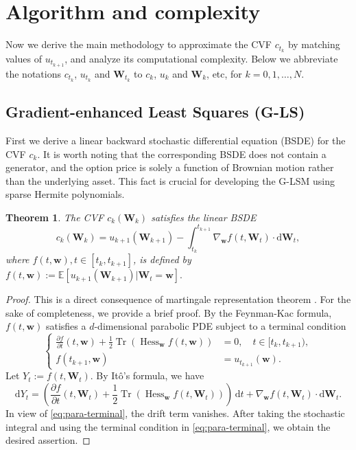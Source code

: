 \documentclass[10pt,a4paper]{amsart}
\numberwithin{equation}{section}
\numberwithin{algorithm}{section}
\theoremstyle{plain}
\newtheorem{theorem}{Theorem}[section]
\theoremstyle{remark}
\newcommand{\dd}{\mathrm{d}}
\begin{document}
\section{Algorithm and complexity} \label{sec:algorithm-cost}
Now we derive the main methodology to approximate the CVF $c_{t_k}$ by matching values of $u_{t_{k+1}}$, and analyze its computational complexity.
Below we abbreviate the notations $c_{t_k}$, $u_{t_k}$ and $\mathbf{W}_{t_k}$ to $c_k$, $u_k$ and $\mathbf{W}_k$, etc, for $k=0,1,\dots, N$.

\subsection{Gradient-enhanced Least Squares (G-LS)}
First we derive a linear backward stochastic differential equation (BSDE) for the CVF $ c_k$. It is worth noting that the corresponding BSDE does not contain a generator, and the option price is solely a function of Brownian motion rather than the underlying asset. This fact is crucial for developing the G-LSM using sparse Hermite polynomials.
\begin{theorem} \label{thm: linear bsde}
The CVF $c_k(\mathbf{W}_k)$ satisfies the linear BSDE
    \begin{equation*}
        c_k(\mathbf{W}_k) = u_{k+1}(\mathbf{W}_{k+1}) - \int_{t_k}^{t_{k+1}} \nabla_{\mathbf{w}}f(t, \mathbf{W}_t) \cdot \mathrm{d}\mathbf{W}_t,
    \end{equation*} 
where $f(t, \mathbf{w}), t\in [t_k, t_{k+1}]$, is defined by
$f(t, \mathbf{w}) := \mathbb{E}[ u_{k+1}(\mathbf{W}_{k+1}) | \mathbf{W}_t = \mathbf{w} ].$
\end{theorem}
\begin{proof}
This is a direct consequence of martingale representation theorem \cite[Theorem 2.5.2]{zhang2017backward}. For the sake of completeness, we provide a brief proof. 
By the Feynman-Kac formula, $f(t, \mathbf{w})$ satisfies a $d$-dimensional parabolic PDE subject to a terminal condition
\begin{equation}\label{eq:para-terminal}
\left\{
\begin{aligned}
\frac{\partial f}{\partial t}(t, \mathbf{w}) + \frac{1}{2}\operatorname{Tr}\left(\operatorname{Hess}_{\mathbf{w}}f(t,\mathbf{w}) \right) &= 0,\quad  t\in [t_k, t_{k+1}), \\
f(t_{k+1}, \mathbf{w}) &= u_{t_{k+1}}(\mathbf{w}).
\end{aligned}
\right.
\end{equation}
Let $Y_t := f(t, \mathbf{W}_t)$. By It\^{o}'s formula, we have
    \begin{equation*}
        \dd Y_t = \left( \frac{\partial f}{\partial t}(t, \mathbf{W}_t) + \frac{1}{2}\operatorname{Tr}\left(\operatorname{Hess}_{\mathbf{w}}f(t,\mathbf{W}_t) \right) \right) \,\mathrm{d}t + \nabla_{\mathbf{w}}f(t, \mathbf{W}_t) \cdot \mathrm{d}\mathbf{W}_t.
    \end{equation*}
In view of \cref{eq:para-terminal}, the drift term vanishes. After taking the stochastic integral and using the terminal condition in \cref{eq:para-terminal}, we obtain the desired assertion.
\end{proof}
\end{document}
